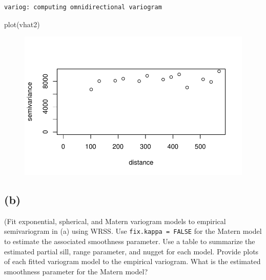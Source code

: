 \documentclass[
  letterpaper,
  DIV=11,
  numbers=noendperiod]{scrartcl}
\newenvironment{Shaded}{\begin{snugshade}}{\end{snugshade}}
\newcommand{\FunctionTok}[1]{\textcolor[rgb]{0.28,0.35,0.67}{#1}}
\newcommand{\NormalTok}[1]{\textcolor[rgb]{0.00,0.23,0.31}{#1}}
\begin{document}
\begin{verbatim}
variog: computing omnidirectional variogram
\end{verbatim}

\begin{Shaded}
\begin{Highlighting}[]
\FunctionTok{plot}\NormalTok{(vhat2)}
\end{Highlighting}
\end{Shaded}

\begin{figure}[H]

{\centering \includegraphics{geo-hw-spdep_files/figure-pdf/unnamed-chunk-6-1.pdf}

}

\end{figure}

\hypertarget{b-1}{%
\subsection{(b)}\label{b-1}}

(Fit exponential, spherical, and Matern variogram models to empirical
semivariogram in (a) using WRSS. Use \texttt{fix.kappa\ =\ FALSE} for
the Matern model to estimate the associated smoothness parameter. Use a
table to summarize the estimated partial sill, range parameter, and
nugget for each model. Provide plots of each fitted variogram model to
the empirical variogram. What is the estimated smoothness parameter for
the Matern model?
\end{document}
